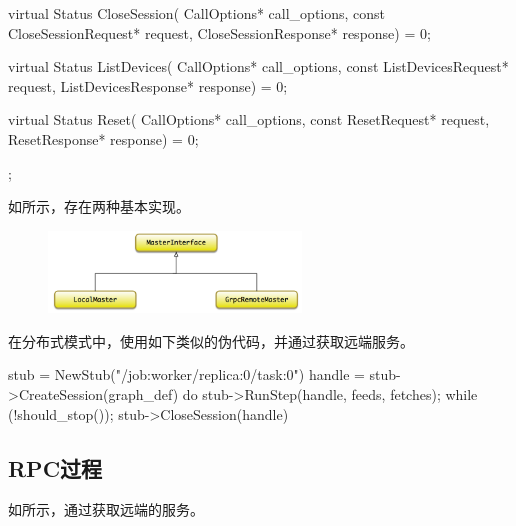 \begin{content}
\begin{leftbar}
\begin{c++}
{  virtual Status CloseSession(
    CallOptions* call_options,
    const CloseSessionRequest* request,
    CloseSessionResponse* response) = 0;

  virtual Status ListDevices(
    CallOptions* call_options,
    const ListDevicesRequest* request,
    ListDevicesResponse* response) = 0;

  virtual Status Reset(
    CallOptions* call_options, const ResetRequest* request,
    ResetResponse* response) = 0;
};
\end{c++}
\end{leftbar}

如所示，存在两种基本实现。

\begin{enum}
\end{enum}

\begin{figure}[H]
\centering
\includegraphics[width=0.6\textwidth]{figures/dist-master-interface.png}
\caption{}
 \label{fig:dist-master-interface}
\end{figure}

在分布式模式中，使用如下类似的伪代码，并通过获取远端服务。

\begin{leftbar}
\begin{c++}
stub = NewStub("/job:worker/replica:0/task:0")
handle = stub->CreateSession({graph_def})
do {
  stub->RunStep(handle, feeds, fetches);
} while (!should_stop());
stub->CloseSession({handle})
\end{c++}
\end{leftbar}

\subsection{RPC过程}

如所示，通过获取远端的服务。


\end{content}
